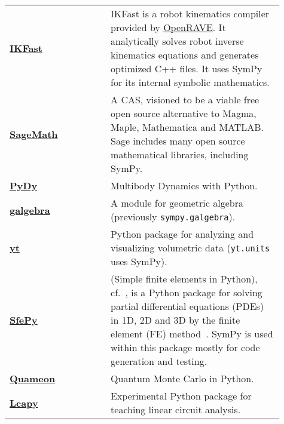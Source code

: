 \begin{longtable}[htbc]{>{\raggedright}p{0.14\linewidth}p{0.14\linewidth}p{0.63\linewidth}}
\href{http://openrave.org/docs/latest_stable/openravepy/ikfast/}{\textbf{IKFast}}~\cite{diankov2010ikfast} &  &
  IKFast is a robot kinematics compiler provided by
  \href{http://openrave.org/}{OpenRAVE}. It analytically solves robot inverse
  kinematics equations and generates optimized C++ files. It uses SymPy for
  its internal symbolic mathematics. \\

\href{http://www.sagemath.org/}{\textbf{SageMath}}~\cite{sagemath} &  & A CAS, visioned to be
  a viable free open source alternative to Magma, Maple, Mathematica and
  MATLAB\@. Sage includes many open source mathematical libraries, including
  SymPy. \\

\href{http://www.pydy.org/}{\textbf{PyDy}}~\cite{gede2013constrained} &  & Multibody Dynamics with
  Python. \\

\href{https://github.com/brombo/galgebra}{\textbf{galgebra}}~\cite{galgebra} &  &
  A module for geometric algebra (previously \texttt{sympy.galgebra}). \\

\href{http://yt-project.org/}{\textbf{yt}}~\cite{2011ApJS..192....9T} &  & Python package for
  analyzing and visualizing volumetric data (\texttt{yt.units} uses SymPy). \\

\href{http://sfepy.org/}{\textbf{SfePy}}~\cite{cimrman2014sfepy} &  & (Simple finite elements in Python),
  cf.~\cite{cimrman2014sfepy}, is a Python package for solving partial
  differential equations (PDEs) in 1D, 2D and 3D by the finite element (FE)
  method~\cite{Zienkiewicz2013FEM}. SymPy is used within this package mostly for
  code generation and testing. \\

\href{http://quameon.sourceforge.net/}{\textbf{Quameon}}~\cite{quameon} &  & Quantum
  Monte Carlo in Python. \\

\href{http://lcapy.elec.canterbury.ac.nz/}{\textbf{Lcapy}}~\cite{lcapy} &  &
  Experimental Python package for teaching linear circuit analysis. \\
\bottomrule
\end{longtable}

